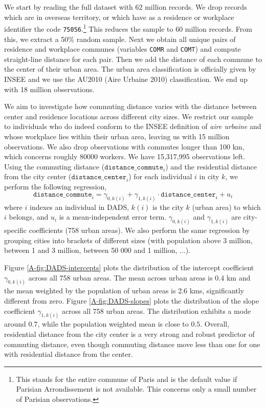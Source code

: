 \documentclass[11pt]{report}
\begin{document}
We start by reading the full dataset with 62 million records. We drop records which are in overseas territory, or which have as a residence or workplace identifier the code \texttt{75056}.\footnote{This stands for the entire commune of Paris and is the default value if Parisian Arrondissement is not available. This concerns only a small number of Parisian observations.}
This reduces the sample to 60 million records. From this, we extract a 50\% random sample.
Next we obtain all unique pairs of residence
and workplace communes (variables \texttt{COMR} and \texttt{COMT}) and 
compute straight-line distance for each pair. 
Then we add the distance of each commune to the center of their urban area. The urban area classification
is officially given by INSEE and we use the AU2010 (Aire Urbaine 2010) classification. We end up with
18 million observations.

We aim to investigate how commuting distance varies with the distance between center and residence locations across different city sizes. We restrict our sample 
to individuals who do indeed conform to the INSEE definition of \emph{aire urbaine} and whose workplace lies within their urban area, leaving us with 15 million observations. We also drop observations with commutes longer than 100 km, 
which concerns roughly 80000 workers. We have 15,317,995 observations left. Using the commuting distance ($\texttt{distance\_commute}_{i}$) and the residential distance from the city center ($\texttt{distance\_center}_{i}$) for each individual $i$ in city $k$, we perform the following regression,
\begin{equation}
\texttt{distance\_commute}_{i} = \gamma_{0,k(i)} + \gamma_{1,k(i)} \cdot \texttt{distance\_center}_{i} + u_i\label{A-eq:d1d2-reg}
\end{equation}
where $i$ indexes an individual in DADS, $k(i)$ is the city $k$ (urban area) to which $i$ belongs, and $u_i$ is a mean-independent error term. $\gamma_{0,k(i)}$ and $\gamma_{1,k(i)}$ are city-specific coefficients (758 urban areas). We also perform the same regression by grouping cities into brackets of different sizes (with population above 3 million, between 1 and 3 million, between 50 000 and 1 million, ...). 

Figure \ref{A-fig:DADS-intercepts} plots the distribution of the intercept coefficient $\gamma_{0,k(i)}$ across all 758 urban areas. The mean across urban areas is 0.4 km and the mean weighted by the population of urban areas is 2.6 kms, significantly different from zero. Figure \ref{A-fig:DADS-slopes} plots the distribution of the slope coefficient $\gamma_{1,k(i)}$ across all 758 urban areas. The distribution exhibits a mode around $0.7$, while the population weighted mean is close to $0.5$. Overall, residential distance from the city center is a very strong and robust predictor of commuting distance, even though commuting distance move less than one for one with residential distance from the center. 
\end{document}
